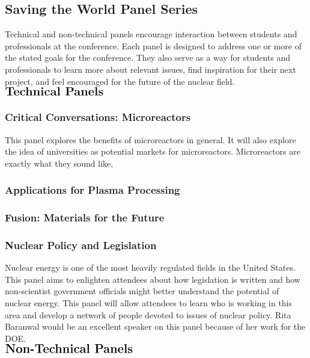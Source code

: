 \subsection{Saving the World Panel Series}
Technical and non-technical panels encourage interaction between students and professionals at the conference. Each panel is designed to address one or more of the stated goals for the conference. They also serve as a way for students and professionals to learn more about relevant issues, find inspiration for their next project, and feel encouraged for the future of the nuclear field.\\
 
$\Large\textbf{Technical Panels}$

\subsubsection{Critical Conversations: Microreactors}
This panel explores the benefits of microreactors in general. It will also explore the idea of universities as potential markets for microreactors. Microreactors are exactly what they sound like, 

\subsubsection{Applications for Plasma Processing}

\subsubsection{Fusion: Materials for the Future}

\subsubsection{Nuclear Policy and Legislation}
Nuclear energy is one of the most heavily regulated fields in the United States. This panel aims to enlighten attendees about how legislation is written and how non-scientist government officials might better understand the potential of nuclear energy. This panel will allow attendees to learn who is working in this area and develop a network of people devoted to issues of nuclear policy.
Rita Baranwal would be an excellent speaker on this panel because of her work for the DOE.\\

$\Large\textbf{Non-Technical Panels}$

